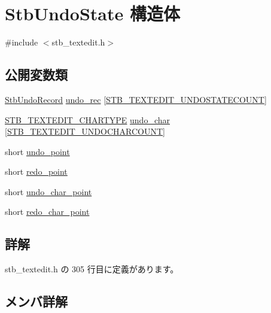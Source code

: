 \hypertarget{struct_stb_undo_state}{}\section{Stb\+Undo\+State 構造体}
\label{struct_stb_undo_state}


{\ttfamily \#include $<$stb\+\_\+textedit.\+h$>$}

\subsection*{公開変数類}
\begin{DoxyCompactItemize}
\item 
\mbox{\hyperlink{struct_stb_undo_record}{Stb\+Undo\+Record}} \mbox{\hyperlink{struct_stb_undo_state_a8cb07be8f304d1620b50bd024709023f}{undo\+\_\+rec}} \mbox{[}\mbox{\hyperlink{stb__textedit_8h_afa79483143df87a1497010712b3dfaf9}{S\+T\+B\+\_\+\+T\+E\+X\+T\+E\+D\+I\+T\+\_\+\+U\+N\+D\+O\+S\+T\+A\+T\+E\+C\+O\+U\+NT}}\mbox{]}
\item 
\mbox{\hyperlink{stb__textedit_8h_a6e64031a061922e3a48d88fd8623f4c3}{S\+T\+B\+\_\+\+T\+E\+X\+T\+E\+D\+I\+T\+\_\+\+C\+H\+A\+R\+T\+Y\+PE}} \mbox{\hyperlink{struct_stb_undo_state_a88320a054aaf18ca122c2b23903a8677}{undo\+\_\+char}} \mbox{[}\mbox{\hyperlink{stb__textedit_8h_a15cbcac55cf92003c28c44734422756a}{S\+T\+B\+\_\+\+T\+E\+X\+T\+E\+D\+I\+T\+\_\+\+U\+N\+D\+O\+C\+H\+A\+R\+C\+O\+U\+NT}}\mbox{]}
\item 
short \mbox{\hyperlink{struct_stb_undo_state_ad29a8695b3e8252ac164d0c2d0be7d7c}{undo\+\_\+point}}
\item 
short \mbox{\hyperlink{struct_stb_undo_state_a719ba014b2db8a8ea55739664b445af0}{redo\+\_\+point}}
\item 
short \mbox{\hyperlink{struct_stb_undo_state_ad5c08b1f8c24678c44407f0ca805afcf}{undo\+\_\+char\+\_\+point}}
\item 
short \mbox{\hyperlink{struct_stb_undo_state_a928f655e4af8945a14d99e944441704a}{redo\+\_\+char\+\_\+point}}
\end{DoxyCompactItemize}


\subsection{詳解}


 stb\+\_\+textedit.\+h の 305 行目に定義があります。



\subsection{メンバ詳解}
\mbox{\label{struct_stb_undo_state_a928f655e4af8945a14d99e944441704a}} 
